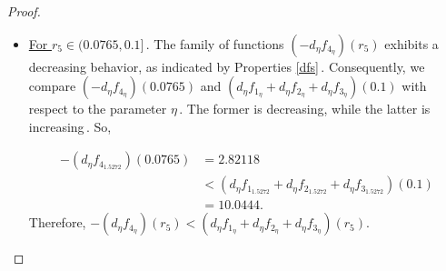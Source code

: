 \documentclass[final,11pt]{article}
\numberwithin{equation}{section}
\theoremstyle{definition}
\begin{document}
\begin{proof}
\begin{itemize}
\begin{itemize}
\begin{itemize}
\begin{itemize}
\item \underline{For $r_{5}\in(0.0765,0.1]$}\,. The family of functions $\left(-d_{\eta}f_{4_{\eta}}\right)(r_{5})$ exhibits a decreasing behavior, as indicated by Properties \ref{dfs}\,. Consequently,  we compare $\left(-d_{\eta}f_{4_{\eta}}\right)(0.0765)$ and $\left(d_{\eta}f_{1_{\eta}}+d_{\eta}f_{2_{\eta}}+d_{\eta}f_{3_{\eta}}\right)(0.1)$ with respect to the parameter $\eta$\,. The former is decreasing, while the latter is increasing\,. So, 

\begin{equation*}
\begin{split}
-\left(d_{\eta}f_{4_{1.5272}}\right)(0.0765)&=2.82118\\
&<\left(d_{\eta}f_{1_{1.5272}}+d_{\eta}f_{2_{1.5272} }+d_{\eta}f_{3_{1.5272}}\right)(0.1)\\
&=10.0444.
\end{split}
\end{equation*}
Therefore, $-\left(d_{\eta}f_{4_{\eta}}\right)(r_{5})<\left(d_{\eta}f_{1_{\eta}}+d_{\eta}f_{2_{\eta} }+d_{\eta}f_{3_{\eta}}\right)(r_{5})$.
\end{itemize}


\end{itemize}
\end{itemize}
\end{itemize}
\end{proof}
\end{document}
